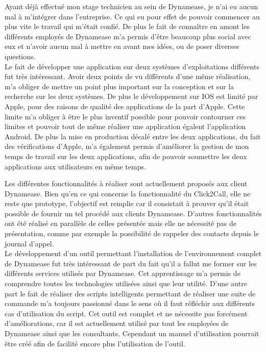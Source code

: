 Ayant déjà effectué mon stage technicien au sein de Dynamease, je n'ai eu aucun mal à m'intégrer dans l'entreprise. Ce qui eu pour effet de pouvoir commencer au plus vite le travail qui m'était confié. De plus le fait de connaître en amont les différents employés de Dynamease m'a permis d'être beaucoup plus social avec eux et n'avoir aucun mal à mettre en avant mes idées, ou de poser diverses questions.\\

Le fait de développer une application sur deux systèmes d'exploitations différents fut très intéressant. Avoir deux points de vu différents d'une même réalisation, m'a obliger de mettre un point plus important sur la conception et sur la recherche sur les deux systèmes. De plus le développement sur IOS est limité par Apple, pour des raisons de qualité des applications de la part d'Apple. Cette limite m'a obliger à être le plus inventif possible pour pouvoir contourner ces limites et pouvoir tout de même réaliser une application égalent l'application Android. De plus la mise en production décalé entre les deux applications, du fait des vérifications d'Apple, m'a également permis d'améliorer la gestion de mon temps de travail sur les deux applications, afin de pouvoir soumettre les deux applications aux utilisateurs en même temps.

Les différentes fonctionnalités à réaliser sont actuellement proposés aux client Dynamease. Bien qu'en ce qui concerne la fonctionnalité du Click2Call, elle ne reste que prototype, l'objectif est remplie car il consistait à prouver qu'il était possible de fournir un tel procédé aux clients Dynamease. D'autres fonctionnalités ont été réalisé en parallèle de celles présentée mais elle ne nécessité pas de présentation, comme par exemple la possibilité de rappeler des contacts depuis le journal d'appel.\\

Le développement d'un outil permettant l'installation de l'environnement complet de Dynamease fut très intéressant de part du fait qu'il a fallut me former sur les différents services utilisés par Dynamease. Cet apprentissage m'a permis de comprendre toutes les technologies utilisées ainsi que leur utilité.  D'une autre part le fait de réaliser des scripts intelligents permettant de réaliser une suite de commande m'a toujours passionné dans le sens où il faut réfléchir aux différents cas d'utilisation du script. Cet outil est complet et ne nécessite pas forcément d'améliorations, car il est actuellement utilisé par tout les employées de Dynamease ainsi que les consultants. Cependant un manuel d'utilisation pourrait être créé afin de facilité encore plus l'utilisation de l'outil.\\ 

